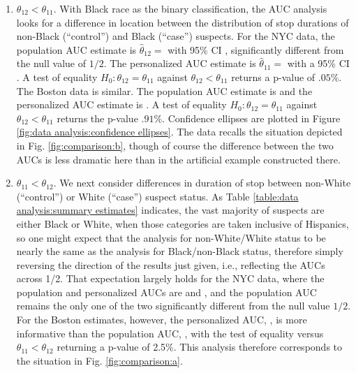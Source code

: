 \documentclass[12pt]{article}
\DeclareMathOperator{\AUC}{AUC}
\newcommand{\cind}{\perp \!\!\! \perp}
\newcommand{\aucindiv}{\theta_{11}}%
\newcommand{\aucpop}{\theta_{12}}%
\newcommand{\aucindivhat}{\hat{\theta}_{11}}%
\newcommand{\aucpophat}{\hat{\theta}_{12}}%
\begin{document}
\begin{enumerate}
\item $\aucpop < \aucindiv$.  With Black race as the
  binary classification, the AUC analysis looks for a difference in
  location between the distribution of stop durations of non-Black
  (``control'') and Black (``case'') suspects. For the NYC data, the
  population AUC estimate is
  $\aucpophat=$ with 95\%
  CI \unskip, significantly
  different from the null value of $1/2$. The personalized AUC
  estimate is
  $\aucindivhat=$ with a
  95\% CI . A test of
  equality $H_0:\aucpop=\aucindiv$ against $\aucpop < \aucindiv$ returns a p-value of $.05\%$. The
  Boston data is similar. The population AUC estimate is
   and the personalized AUC estimate
  is . A test of equality
  $H_0:\aucpop=\aucindiv$ against $\aucpop < \aucindiv$ returns the p-value $.91\%$. Confidence
  ellipses are plotted in Figure \ref{fig:data analysis:confidence
    ellipses}. The data recalls the situation depicted in
  Fig. \ref{fig:comparison:b}, though of course the difference between
  the two AUCs is less dramatic here than in the artificial example
  constructed there.

\item $\aucindiv < \aucpop$. We next consider differences in duration of
  stop between non-White (``control'') or White (``case'') suspect
  status. As Table \ref{table:data analysis:summary estimates}
  indicates, the vast majority of suspects are either Black or White,
  when those categories are taken inclusive of Hispanics, so one might
  expect that the analysis for non-White/White status to be nearly
  the same as the analysis for Black/non-Black status, therefore
  simply reversing the direction of the results just given, i.e.,
  reflecting the AUCs across 1/2. That expectation largely holds for
  the NYC data, where the population and personalized AUCs are
   and
  , and the population AUC
  remains the only one of the two significantly different from the
  null value $1/2$. For the Boston estimates, however, the
  personalized AUC, \unskip,
  is more informative than the population AUC,
  \unskip, with the test of
  equality versus $\aucindiv < \aucpop$ returning a p-value of
  2.5\%. This
  analysis therefore corresponds to the situation in
  Fig. \ref{fig:comparison:a}.


\end{enumerate}
\end{document}
